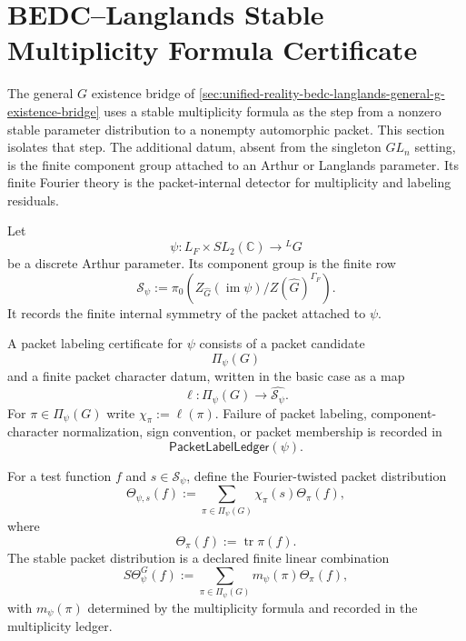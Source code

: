 \section{BEDC--Langlands Stable Multiplicity Formula Certificate}
\label{sec:unified-reality-bedc-langlands-stable-multiplicity-formula-cert}

The general $G$ existence bridge of
\autoref{sec:unified-reality-bedc-langlands-general-g-existence-bridge}
uses a stable multiplicity formula as the step from a nonzero stable
parameter distribution to a nonempty automorphic packet. This section
isolates that step. The additional datum, absent from the singleton
$GL_n$ setting, is the finite component group attached to an Arthur or
Langlands parameter. Its finite Fourier theory is the packet-internal
detector for multiplicity and labeling residuals.

\begin{definition}
\label{def:unified-reality-arthur-component-group}
Let
$$
\psi:L_F\times SL_2(\mathbb C)\to{}^LG
$$
be a discrete Arthur parameter. Its component group is the finite row
$$
\mathcal S_\psi
:=
\pi_0\left(
Z_{\widehat G}(\operatorname{im}\psi)/Z(\widehat G)^{\Gamma_F}
\right).
$$
It records the finite internal symmetry of the packet attached to
$\psi$.
\end{definition}

\begin{definition}
\label{def:unified-reality-packet-fourier-ledger}
A packet labeling certificate for $\psi$ consists of a packet candidate
$$
\Pi_\psi(G)
$$
and a finite packet character datum, written in the basic case as a map
$$
\ell:\Pi_\psi(G)\to\widehat{\mathcal S_\psi}.
$$
For $\pi\in\Pi_\psi(G)$ write $\chi_\pi:=\ell(\pi)$. Failure of packet
labeling, component-character normalization, sign convention, or packet
membership is recorded in
$$
\mathsf{PacketLabelLedger}(\psi).
$$
\end{definition}

\begin{definition}
\label{def:unified-reality-packet-fourier-distributions}
For a test function $f$ and $s\in\mathcal S_\psi$, define the
Fourier-twisted packet distribution
$$
\Theta_{\psi,s}(f)
:=
\sum_{\pi\in\Pi_\psi(G)}
\chi_\pi(s)\Theta_\pi(f),
$$
where
$$
\Theta_\pi(f):=\operatorname{tr}\pi(f).
$$
The stable packet distribution is a declared finite linear combination
$$
S\Theta_\psi^G(f)
:=
\sum_{\pi\in\Pi_\psi(G)}
m_\psi(\pi)\Theta_\pi(f),
$$
with $m_\psi(\pi)$ determined by the multiplicity formula and recorded
in the multiplicity ledger.
\end{definition}

